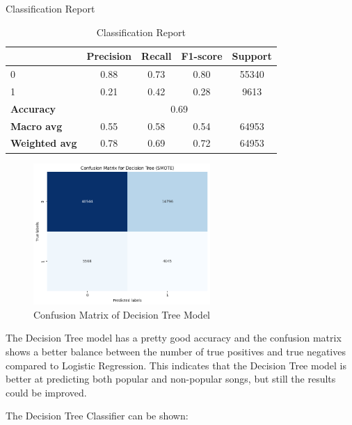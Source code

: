 Classification Report
\begin{table}[h]
    \centering
    \begin{tabular}{lcccc}
        \toprule
        & \textbf{Precision} & \textbf{Recall} & \textbf{F1-score} & \textbf{Support} \\
        \midrule
        0 & 0.88 & 0.73 & 0.80 & 55340 \\
        1 & 0.21 & 0.42 & 0.28 & 9613 \\
        \midrule
        \textbf{Accuracy} & \multicolumn{4}{c}{0.69} \\
        \textbf{Macro avg} & 0.55 & 0.58 & 0.54 & 64953 \\
        \textbf{Weighted avg} & 0.78 & 0.69 & 0.72 & 64953 \\
        \bottomrule
    \end{tabular}
    \caption{Classification Report}
    \label{tab:classification_report}
\end{table}
 
\begin{figure}[h] 
    \centering 
    \includegraphics[width=0.6\textwidth]{media/decision_tree_conf_matr.png}
    \caption{Confusion Matrix of Decision Tree Model}

\end{figure}

The Decision Tree model has a pretty good accuracy and the confusion matrix shows a better balance between the number of true positives and true negatives compared to Logistic Regression. This indicates that the Decision Tree model is better at predicting both popular and non-popular songs, but still the results could be improved.

\newpage
The Decision Tree Classifier can be shown:

